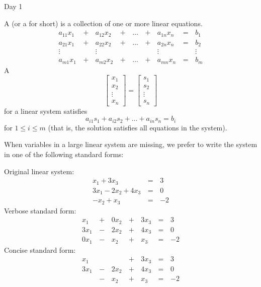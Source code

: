 \begin{applicationActivities}{Day 1}
\begin{definition}
A  (or a  for short)
is a collection of one or more linear equations.
  \begin{alignat*}{5}
    a_{11}x_1 &\,+\,& a_{12}x_2 &\,+\,& \dots  &\,+\,& a_{1n}x_n &\,=\,& b_1 \\
    a_{21}x_1 &\,+\,& a_{22}x_2 &\,+\,& \dots  &\,+\,& a_{2n}x_n &\,=\,& b_2 \\
     \vdots&  &\vdots&   &&  &\vdots&&\vdots  \\
    a_{m1}x_1 &\,+\,& a_{m2}x_2 &\,+\,& \dots  &\,+\,& a_{mn}x_n &\,=\,& b_m
  \end{alignat*}
A 
\[
  \begin{bmatrix}
    x_1 \\
    x_2 \\
    \vdots \\
    x_n
  \end{bmatrix}=
  \begin{bmatrix}
    s_1 \\
    s_2 \\
    \vdots \\
    s_n
  \end{bmatrix}
\]
for a linear system satisfies
\[
a_{i1}s_1+a_{i2}s_2+\dots+a_{in}s_n=b_i
\]
for \(1\leq i\leq m\) (that is, the solution satisfies all equations
in the system).
\end{definition}

\begin{remark}
  When variables in a large linear system are missing, we prefer to
  write the system in one of the following standard forms:

  \begin{multicols}{3}\noindent
    Original linear system:
    \begin{alignat*}{2}
       x_1 + 3x_3 &\,=\,& 3 \\
      3x_1 - 2x_2 + 4x_3 &\,=\,& 0 \\
      -x_2 +  x_3 &\,=\,& -2
    \end{alignat*}
    Verbose standard form:
    \begin{alignat*}{4}
       x_1 &\,+\,& 0x_2 &\,+\,& 3x_3 &\,=\,& 3 \\
      3x_1 &\,-\,& 2x_2 &\,+\,& 4x_3 &\,=\,& 0 \\
      0x_1 &\,-\,&  x_2 &\,+\,&  x_3 &\,=\,& -2
    \end{alignat*}
    Concise standard form:
    \begin{alignat*}{4}
       x_1 &     &      &\,+\,& 3x_3 &\,=\,& 3 \\
      3x_1 &\,-\,& 2x_2 &\,+\,& 4x_3 &\,=\,& 0 \\
           &\,-\,&  x_2 &\,+\,&  x_3 &\,=\,& -2
    \end{alignat*}
  \end{multicols}
\end{remark}


\end{applicationActivities}
